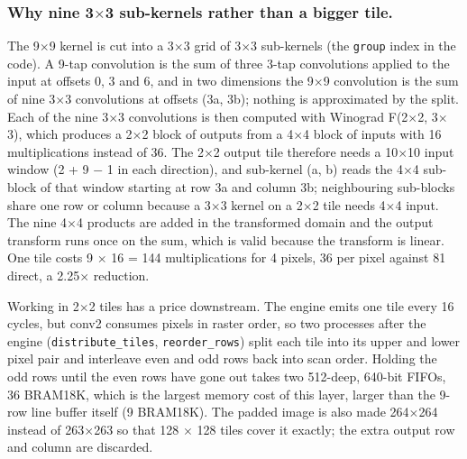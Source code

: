 \subsubsection{Why nine 3$\times$3 sub-kernels rather than a bigger tile.}\label{sec:4.3.3}

The 9$\times$9 kernel is cut into a 3$\times$3 grid of 3$\times$3 sub-kernels (the \texttt{group} index in the code). A 9-tap convolution is the sum of three 3-tap convolutions applied to the input at offsets 0, 3 and 6, and in two dimensions the 9$\times$9 convolution is the sum of nine 3$\times$3 convolutions at offsets (3a, 3b); nothing is approximated by the split. Each of the nine 3$\times$3 convolutions is then computed with Winograd F(2$\times$2, 3$\times$3), which produces a 2$\times$2 block of outputs from a 4$\times$4 block of inputs with 16 multiplications instead of 36. The 2$\times$2 output tile therefore needs a 10$\times$10 input window (2 + 9 $-$ 1 in each direction), and sub-kernel (a, b) reads the 4$\times$4 sub-block of that window starting at row 3a and column 3b; neighbouring sub-blocks share one row or column because a 3$\times$3 kernel on a 2$\times$2 tile needs 4$\times$4 input. The nine 4$\times$4 products are added in the transformed domain and the output transform runs once on the sum, which is valid because the transform is linear. One tile costs 9 $\times$ 16 = 144 multiplications for 4 pixels, 36 per pixel against 81 direct, a 2.25$\times$ reduction.

Working in 2$\times$2 tiles has a price downstream. The engine emits one tile every 16 cycles, but conv2 consumes pixels in raster order, so two processes after the engine (\texttt{distribute\_tiles}, \texttt{reorder\_rows}) split each tile into its upper and lower pixel pair and interleave even and odd rows back into scan order. Holding the odd rows until the even rows have gone out takes two 512-deep, 640-bit FIFOs, 36 BRAM18K, which is the largest memory cost of this layer, larger than the 9-row line buffer itself (9 BRAM18K). The padded image is also made 264$\times$264 instead of 263$\times$263 so that 128 $\times$ 128 tiles cover it exactly; the extra output row and column are discarded.

